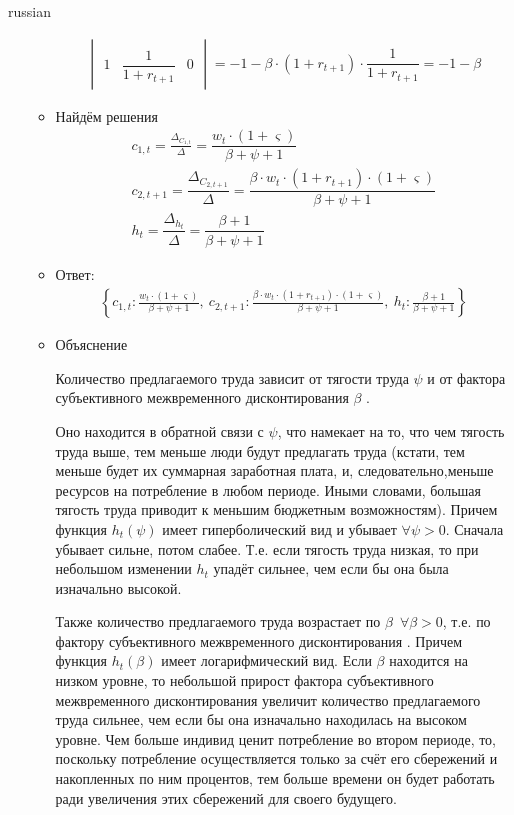 \documentclass[fleqn]{article}
\begin{document}
\begin{otherlanguage*}{russian}
\begin{enumerate}[label=\alph*), leftmargin=*]
\begin{itemize}
\begin{align*}
\begin{vmatrix}
\\
1 & \dfrac{1}{1 + r_{t+1}} & 0
\end{vmatrix} = -1 - \beta \cdot (1 + r_{t+1}) \cdot \dfrac{1}{1 + r_{t+1}} = -1 - \beta 
\end{align*}
\item Найдём решения
\begin{align*}
c_{1, t} = \frac{\Delta_{C_{1, t}}}{\Delta} = \dfrac{w_t \cdot (1 + \varsigma)}{\beta + \psi + 1} \\
c_{2, t+1} = \dfrac{\Delta_{C_{2, t+1}}}{\Delta} = \dfrac{\beta \cdot w_t \cdot (1 + r_{t+1}) \cdot (1 + \varsigma)}{\beta + \psi + 1} \\
h_t = \dfrac{\Delta_{h_t}}{\Delta} = \dfrac{\beta + 1}{\beta + \psi + 1}
\end{align*}
\item Ответ: 
\begin{align*}
\left\{ c_{1, t} : \frac{w_t \cdot (1 + \varsigma)}{\beta + \psi + 1}, \  c_{2, t+1} : \frac{\beta \cdot w_t  \cdot (1 + r_{t+1}) \cdot (1 + \varsigma) }{\beta + \psi + 1}, \  h_{t} : \frac{\beta + 1}{\beta + \psi + 1}\right\}
\end{align*}
\item Объяснение

Количество предлагаемого труда зависит от тягости труда $\psi $ и от фактора субъективного межвременного дисконтирования $\beta  $ . 

Оно находится в обратной связи с  $ \psi $, что намекает на то, что чем тягость труда выше, тем меньше люди будут предлагать труда (кстати, тем меньше будет их суммарная заработная плата, и, следовательно,меньше ресурсов на потребление в любом периоде. Иными словами, большая тягость труда приводит к меньшим бюджетным возможностям). Причем функция $h_t (\psi) $ имеет гиперболический вид и убывает $ \forall \psi > 0 $. Сначала убывает сильне, потом слабее. Т.е. если тягость труда низкая, то при небольшом изменении $ h_t$ упадёт сильнее, чем если бы она была изначально высокой. 

Также количество предлагаемого труда возрастает по $ \beta \,\,\, \forall \beta > 0 $, т.е. по фактору субъективного межвременного дисконтирования . Причем функция $ h_t (\beta) $ имеет логарифмический вид. Если $\beta $ находится на низком уровне, то небольшой прирост фактора субъективного межвременного дисконтирования увеличит количество предлагаемого труда сильнее, чем если бы она изначально находилась на высоком уровне. Чем больше индивид ценит потребление во втором периоде, то, поскольку потребление осуществляется только за счёт его сбережений и накопленных по ним процентов, тем больше времени он будет работать ради увеличения этих сбережений для своего будущего. 


\end{itemize}
\end{enumerate}
\end{otherlanguage*}
\end{document}
